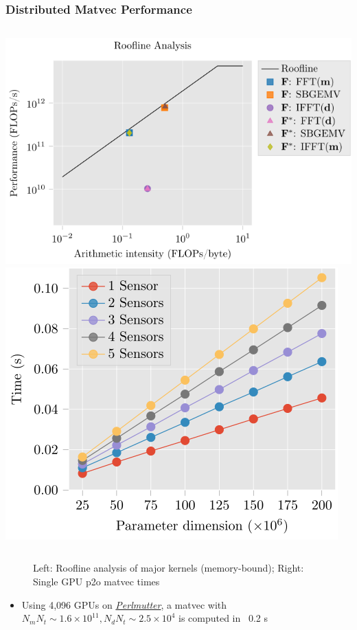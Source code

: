 \begin{frame}
    \frametitle{Distributed Matvec Performance}
    \begin{columns}
        \includegraphics[width=\textwidth]{JMM/images/matvec/roofline.svg}
        \includegraphics[width=\textwidth]{JMM/images/matvec/single_gpu_scaling.svg}
    \end{columns}
    \begin{figure}
        \caption{Left: Roofline analysis of major kernels (memory-bound); Right: Single GPU p2o matvec times}
    \end{figure}
    \begin{itemize}
        \item Using 4,096 GPUs on \href{https://docs.nersc.gov/systems/perlmutter/architecture/}{\emph{Perlmutter}}, a matvec with \(N_mN_t \sim 1.6\times 10^{11}, N_dN_t\sim2.5\times10^4\) is computed in ~0.2 s
    \end{itemize}
\end{frame}
